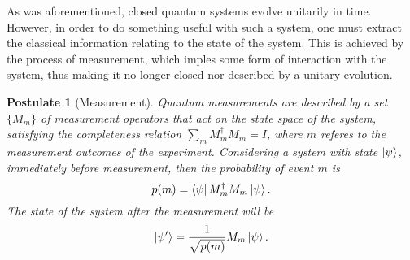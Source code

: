 \documentclass[../../dissertation.tex]{subfiles}
\newtheorem{post}{Postulate}
\begin{document}
As was aforementioned, closed quantum systems evolve unitarily in time.
However, in order to do something useful with such a system, one must extract
the classical information relating to the state of the system. This is achieved
by the process of measurement, which imples some form of interaction with the
system, thus making it no longer closed nor described by a unitary evolution.
\begin{post}[Measurement]
Quantum measurements are described by a set $\{M_m\}$ of measurement operators that act on the state space of the system, satisfying the completeness relation $\sum_m M_m^\dag M_m = I$, where $m$ referes to the measurement outcomes of the experiment. Considering a system with state $\ket{\psi}$, immediately before measurement, then the probability of event $m$ is
\begin{equation}
	p(m) = \bra{\psi} M_m^\dag M_m \ket{\psi}.
\end{equation}
The state of the system after the measurement will be
\begin{equation}
\ket{\psi'} = \frac{1}{\sqrt{p(m)}} M_m \ket{\psi}.
\end{equation}

\end{post}
\end{document}
